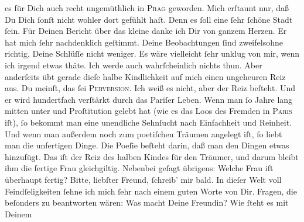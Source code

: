 \begin{ledgroupsized}[t]{13cm}
               es für Dich auch recht ungemüthlich in \textsc{Prag} geworden. Mich erſtaunt nur, daß Du Dich ſonſt nicht wohler dort gefühlt haſt.
               Denn es ſoll eine ſehr ſchöne Stadt ſein.\pend
           \pstart
           Für Deinen Bericht über das kleine \label{K_L02833-6v}\label{K_L02833-6h} danke ich Dir von ganzem Herzen. Er hat mich ſehr nachdenklich geſtimmt.
               Deine Beobachtungen {\pb}ſind zweifelsohne richtig,
               Deine  Schlüſſe nicht weniger. Es wäre vielleicht ſehr unklug von mir, wenn ich
               irgend etwas thäte. Ich werde auch wahrſcheinlich nichts thun. Aber anderſeits übt
               gerade dieſe halbe Kindlichkeit auf mich  einen ungeheuren Reiz aus. Du meinſt, das ſei \textsc{Perversion}. Ich weiß es nicht, aber der Reiz beſteht. Und er wird
               hundertfach verſtärkt durch das Pariſer Leben.
               Wenn man ſo Jahre lang mitten unter \label{K_L02833-7v}\label{K_L02833-7h} und Proſtitution gelebt hat (wie es das Loos des Fremden in \textsc{Paris} iſt), ſo bekommt man eine unendliche Sehnſucht nach {\pb}Einfachheit und Reinheit. Und wenn man außerdem noch
               zum poetiſchen Träumen  angelegt iſt, ſo liebt man
               die unfertigen Dinge. Die Poeſie beſteht darin, daß man den Dingen etwas hinzufügt.
               Das iſt der Reiz des halben Kindes für den Träumer, und darum bleibt \strikeout{\textcolor{gray}{×}\-\textcolor{gray}{×}} ihm die fertige Frau gleichgiltig. Nebenbei geſagt übrigens: Welche Frau iſt
               überhaupt fertig?\pend
           \pstart
           Bitte, liebſter Freund, ſchreib’ mir bald. In dieſer {\pb}Welt voll Feindſeligkeiten ſehne ich mich ſehr nach einem guten Worte von Dir.\pend
           \pstart
           Fragen, die beſonders zu beantworten wären: Was macht Deine Freundin?  Wie ſteht es mit Deinem \label{K_L02833-8v}
\end{ledgroupsized}
